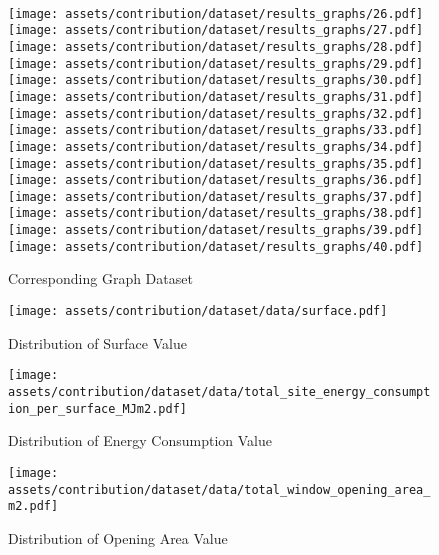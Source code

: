 \documentclass[a4paper, 12pt]{report}
\begin{document}
\begin{figure}
\\[\smallskipamount]
\texttt{[image: assets/contribution/dataset/results\_graphs/26.pdf]}\hfill
\texttt{[image: assets/contribution/dataset/results\_graphs/27.pdf]}\hfill
\texttt{[image: assets/contribution/dataset/results\_graphs/28.pdf]}\hfill
\texttt{[image: assets/contribution/dataset/results\_graphs/29.pdf]}\hfill
\texttt{[image: assets/contribution/dataset/results\_graphs/30.pdf]}
\\[\smallskipamount]
\texttt{[image: assets/contribution/dataset/results\_graphs/31.pdf]}\hfill
\texttt{[image: assets/contribution/dataset/results\_graphs/32.pdf]}\hfill
\texttt{[image: assets/contribution/dataset/results\_graphs/33.pdf]}\hfill
\texttt{[image: assets/contribution/dataset/results\_graphs/34.pdf]}\hfill
\texttt{[image: assets/contribution/dataset/results\_graphs/35.pdf]}
\\[\smallskipamount]
\texttt{[image: assets/contribution/dataset/results\_graphs/36.pdf]}\hfill
\texttt{[image: assets/contribution/dataset/results\_graphs/37.pdf]}\hfill
\texttt{[image: assets/contribution/dataset/results\_graphs/38.pdf]}\hfill
\texttt{[image: assets/contribution/dataset/results\_graphs/39.pdf]}\hfill
\texttt{[image: assets/contribution/dataset/results\_graphs/40.pdf]}
\caption{Corresponding Graph Dataset}
\label{fig:corresponding-graph-dataset}
\end{figure}

\begin{figure}
\centering
\texttt{[image: assets/contribution/dataset/data/surface.pdf]}
\caption{Distribution of Surface Value}
\label{fig:distribution-of-surface-value}
\end{figure}

\begin{figure}
\centering
\texttt{[image: assets/contribution/dataset/data/total\_site\_energy\_consumption\_per\_surface\_MJm2.pdf]}
\caption{Distribution of Energy Consumption Value}
\label{fig:distribution-of-energy-consumption-value}
\end{figure}

\begin{figure}
\centering
\texttt{[image: assets/contribution/dataset/data/total\_window\_opening\_area\_m2.pdf]}
\caption{Distribution of Opening Area Value}
\label{fig:distribution-of-opening-area-value}
\end{figure}
\end{document}
